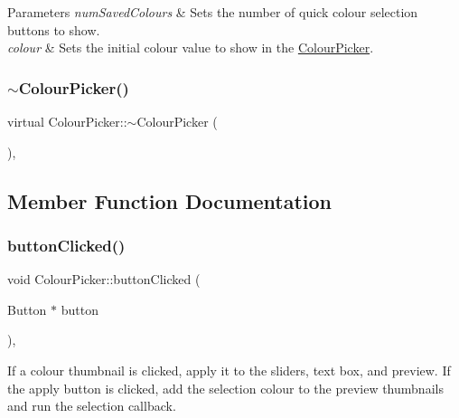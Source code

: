\begin{DoxyParams}{Parameters}
{\em num\+Saved\+Colours} & Sets the number of quick colour selection buttons to show.\\
\hline
{\em colour} & Sets the initial colour value to show in the \mbox{\hyperlink{classColourPicker}{Colour\+Picker}}. \\
\hline
\end{DoxyParams}
\mbox{\label{classColourPicker_af32a8228429703caf9773fd487dfb130}} 
\subsubsection{\texorpdfstring{$\sim$\+Colour\+Picker()}{~ColourPicker()}}
{\footnotesize\ttfamily virtual Colour\+Picker\+::$\sim$\+Colour\+Picker (\begin{DoxyParamCaption}{ }\end{DoxyParamCaption})\hspace{0.3cm}{\ttfamily [inline]}, {\ttfamily [virtual]}}



\subsection{Member Function Documentation}
\mbox{\label{classColourPicker_a937924ab624cb81d4f2cb1e094ead86b}} 
\subsubsection{\texorpdfstring{button\+Clicked()}{buttonClicked()}}
{\footnotesize\ttfamily void Colour\+Picker\+::button\+Clicked (\begin{DoxyParamCaption}\item[{Button $\ast$}]{button }\end{DoxyParamCaption})\hspace{0.3cm}{\ttfamily [override]}, {\ttfamily [protected]}}

If a colour thumbnail is clicked, apply it to the sliders, text box, and preview. If the apply button is clicked, add the selection colour to the preview thumbnails and run the selection callback. \mbox{\label{classColourPicker_a7a30eb54f6ba258e4108621787466e3e}} 
